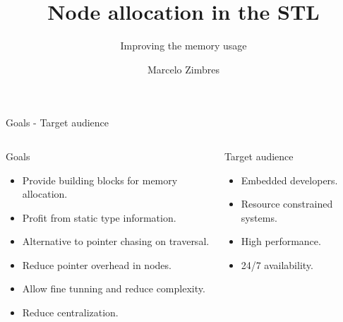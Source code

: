 \documentclass[10pt,aspectratio=169]{beamer}
\title[Node allocation in the STL]
{Node allocation in the STL}
\subtitle[Improving the memory usage]
{Improving the memory usage}
\author[Marcelo Zimbres] {Marcelo Zimbres}
\institute[Physicist]
{
}
\date[Magstadt] {}
\begin{document}
\begin{frame}
  \titlepage
\end{frame}






\begin{frame}{Goals - Target audience}{}
\begin{columns}
\begin{column}{0.50\textwidth}
\begin{block} {Goals}
\begin{itemize}
    \item Provide building blocks for memory allocation.
    \item Profit from static type information.
    \item Alternative to pointer chasing on traversal.
    \item Reduce pointer overhead in nodes.
    \item Allow fine tunning and reduce complexity.
    \item Reduce centralization.
\end{itemize}
\end{block}

\end{column}

\begin{column}{0.35\textwidth}
\begin{block} {Target audience}
\begin{itemize}
    \item Embedded developers.
    \item Resource constrained systems.
    \item High performance.
    \item 24/7 availability.
\end{itemize}
\end{block}
\end{column}
\end{columns}
\end{frame}
\end{document}
